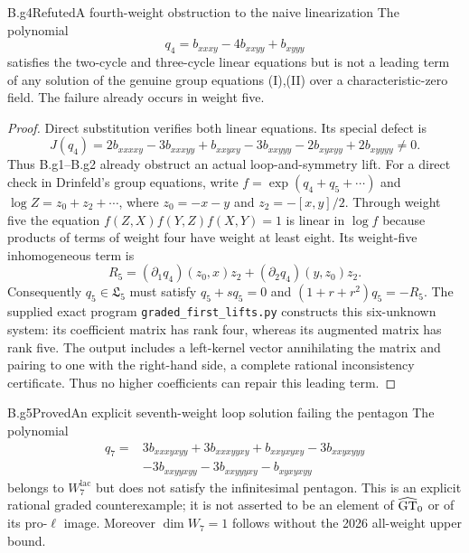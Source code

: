 \begin{claim}{B.g4}{Refuted}{A fourth-weight obstruction to the naive linearization}
The polynomial
\[
 q_4=b_{xxxy}-4b_{xxyy}+b_{xyyy}
\]
satisfies the two-cycle and three-cycle linear equations but is not a
leading term of any solution of the genuine group equations (I),(II)
over a characteristic-zero field.  The failure already occurs in
weight five.
\end{claim}

\begin{proof}
Direct substitution verifies both linear equations.  Its special
defect is
\[
 J(q_4)=2b_{xxxxy}-3b_{xxxyy}+b_{xxyxy}
       -3b_{xxyyy}-2b_{xyxyy}+2b_{xyyyy}\ne0.
\]
Thus B.g1--B.g2 already obstruct an actual loop-and-symmetry lift.
For a direct check in Drinfeld's group equations, write
$f=\exp(q_4+q_5+\cdots)$ and
$\log Z=z_0+z_2+\cdots$, where
$z_0=-x-y$ and $z_2=-[x,y]/2$.
Through weight five the equation
$f(Z,X)f(Y,Z)f(X,Y)=1$ is linear in $\log f$ because products of
terms of weight four have weight at least eight.
Its weight-five inhomogeneous term is
\[
 R_5=(\partial_1q_4)(z_0,x)z_2
       +(\partial_2q_4)(y,z_0)z_2.
\]
Consequently $q_5\in\mathfrak L_5$ must satisfy
$q_5+s q_5=0$ and $(1+r+r^2)q_5=-R_5$.
The supplied exact program \texttt{graded\_first\_lifts.py} constructs
this six-unknown system: its coefficient matrix has rank four, whereas
its augmented matrix has rank five.  The output includes a left-kernel
vector annihilating the matrix and pairing to one with the right-hand
side, a complete rational inconsistency certificate.  Thus no higher
coefficients can repair this leading term.
\end{proof}

\begin{claim}{B.g5}{Proved}{An explicit seventh-weight loop solution failing the pentagon}
The polynomial
\begin{align*}
 q_7={}&3b_{xxxyxyy}+3b_{xxxyyxy}+b_{xxyxyxy}
       -3b_{xxyxyyy}\\
      &-3b_{xxyyxyy}-3b_{xxyyyxy}-b_{xyxyxyy}
\end{align*}
belongs to $W^{\mathrm{lac}}_7$ but does not satisfy the infinitesimal
pentagon.  This is an explicit rational graded counterexample; it is
not asserted to be an element of $\widehat{\mathrm{GT}}_0$ or of its pro-$\ell$ image.
Moreover $\dim W_7=1$ follows without the 2026 all-weight upper bound.
\end{claim}

